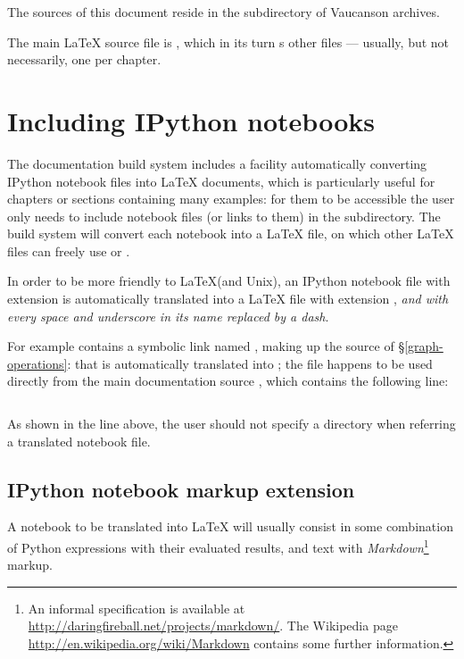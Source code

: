 The sources of this document reside in the 
subdirectory of Vaucanson archives.

\index{\LaTeX{}}
The main \LaTeX{} source file is
, which in its turn
\verb!!s other files --- usually, but not necessarily, one per
chapter.

\section{Including IPython notebooks}
The documentation build system includes a facility automatically
converting IPython notebook files into \LaTeX{} documents, which is
particularly useful for chapters or sections containing many examples:
for them to be accessible the user only needs to include notebook
files (or links to them) in the 
subdirectory.  The build system will convert each notebook into a
\LaTeX{} file, on which other \LaTeX{} files can freely use
\verb!! or \verb!!.

In order to be more friendly to \LaTeX (and Unix), an IPython notebook
file with extension  is automatically translated into a
\LaTeX{} file with extension , \textit{and with every space
  and underscore in its name replaced by a dash}.

For example  contains a symbolic
link named , making up the source of
§\ref{graph-operations}: that is automatically translated into
; the file happens to be used directly from
the main documentation source , which
contains the following line:
\begin{verbatim}

\end{verbatim}
As shown in the line above, the user should not specify a directory
when referring a translated notebook file.

\subsection{IPython notebook markup extension}
A notebook to be translated into \LaTeX{} will usually consist in some
combination of Python expressions with their evaluated results, and
text with \textit{Markdown}\footnote{An informal specification is
  available at \url{http://daringfireball.net/projects/markdown/}.
  The Wikipedia page \url{http://en.wikipedia.org/wiki/Markdown}
  contains some further information.}
markup.

